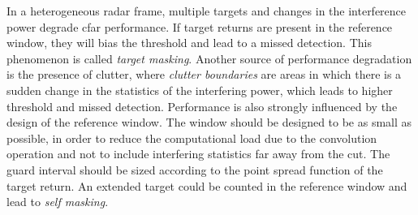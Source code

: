 In a heterogeneous radar frame, multiple targets and changes in the interference power degrade \gls{cfar} performance. If target returns are present in the reference window, they will bias the threshold and lead to a missed detection. This phenomenon is called \textit{target masking}. Another source of performance degradation is the presence of clutter, where \textit{clutter boundaries} are areas in which there is a sudden change in the statistics of the interfering power, which leads to higher threshold and missed detection.
Performance is also strongly influenced by the design of the reference window. The window should be designed to be as small as possible, in order to reduce the computational load due to the convolution operation and not to include interfering statistics far away from the \gls{cut}. The guard interval should be sized according to the point spread function of the target return. An extended target could be counted in the reference window and lead to \textit{self masking}.
